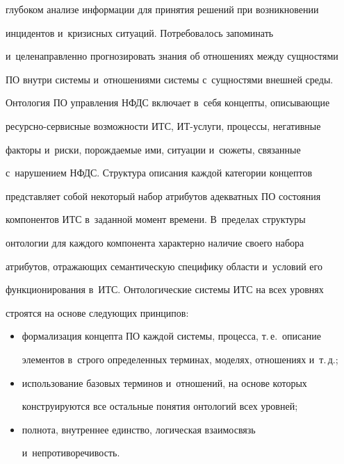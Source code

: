 глубоком анализе информации для принятия решений при возникновении


инцидентов и~кризисных ситуаций. Потребовалось запоминать


и~целенаправленно прогнозировать знания об отношениях между сущностями


ПО внутри системы и~отношениями системы с~сущностями внешней среды.











  Онтология ПО управления НФДС включает в~себя концепты, описы\-ва\-ющие


ре\-сурс\-но-сер\-вис\-ные возможности ИТС, ИТ-услуги, процессы, негативные


факторы и~риски, порождаемые ими, ситуации и~сюжеты, связанные


с~нарушением НФДС. Структура описания каждой категории концептов


представляет собой некоторый набор атрибутов адекватных ПО состояния


компонентов ИТС в~заданной момент времени. В~пределах структуры


онтологии для каждого компонента характерно наличие своего набора


атрибутов, отражающих семантическую специфику области и~условий его


функционирования в~ИТС. Онтологические системы ИТС на всех уровнях


строятся на основе следующих принципов:


  \begin{itemize}


\item формализация концепта ПО каждой системы, процесса, т.\,е.\ описание


элементов в~строго определенных терминах, моделях, отношениях и~т.\,д.;


  \item  использование базовых терминов и~отношений, на основе которых


конст\-ру\-иру\-ют\-ся все остальные понятия онтологий всех уровней;


  \item  полнота, внутреннее единство, логическая взаимосвязь


и~непротиворечивость.


  \end{itemize}












